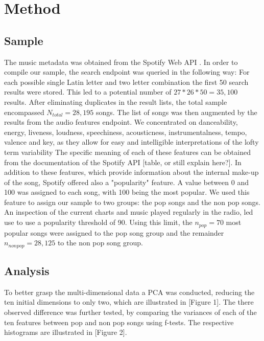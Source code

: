 \documentclass{article}
\begin{document}
\section{Method}

\subsection{Sample}
The music metadata was obtained from the Spotify Web API \citep{spotify}. In order to compile our sample, the search endpoint was queried in the following way: For each possible single Latin letter and two letter combination the first 50 search results were stored. This led to a potential number of \(27 * 26 * 50 = 35,100\) results. After eliminating duplicates in the result lists, the total sample encompassed \(N_{total} = 28,195\) songs. The list of songs was then augmented by the results from the audio features endpoint. We concentrated on danceability, energy, liveness, loudness, speechiness, acousticness, instrumentalness, tempo, valence and key, as they allow for easy and intelligible interpretations of the lofty term variability %
The specific meaning of each of these features can be obtained from the documentation of the Spotify API \citep{spotifyAPIdocu}[table, or still explain here?]. In addition to these features, which provide information about the internal make-up of the song, Spotify offered also a "popularity" feature. A value between 0 and 100 was assigned to each song, with 100 being the most popular. We used this feature to assign our sample to two groups: the pop songs and the non pop songs. An inspection of the current charts and music played regularly in the radio, led use to use a popularity threshold of 90. Using this limit, the \(n_{pop} = 70\) most popular songs were assigned to the pop song group and the remainder \(n_{non pop} = 28,125\) to the non pop song group.

\subsection{Analysis}
To better grasp the multi-dimensional data a PCA was conducted, reducing the ten initial dimensions to only two, which are illustrated in [Figure 1]. 
The there observed difference was further tested, by comparing the variances of each of the ten features between pop and non pop songs using f-tests. The respective histograms are illustrated in [Figure 2]. 
\end{document}
